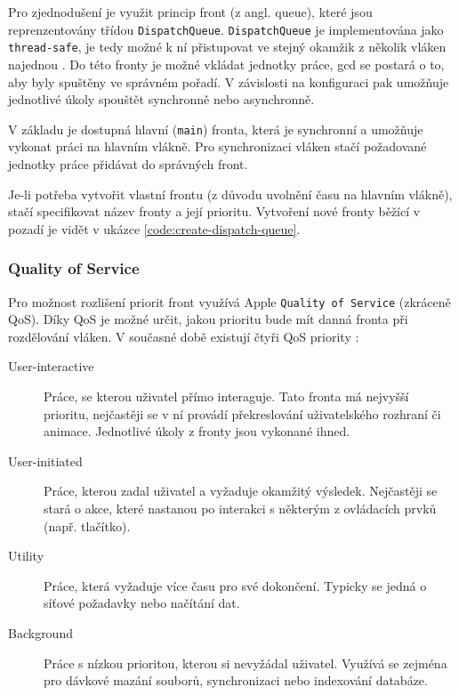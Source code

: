 Pro zjednodušení je využit princip front (z angl. queue), které jsou reprenzentovány třídou \texttt{DispatchQueue}.
\texttt{DispatchQueue} je implementována jako \texttt{thread-safe}, je tedy možné k ní přistupovat ve stejný okamžik z několik vláken najednou \cite{apple-concurrency-programming-guide}.
Do této fronty je možné vkládat jednotky práce, \acrshort{gcd} se postará o to, aby byly spuštěny ve správném pořadí.
V závislosti na konfiguraci pak umožňuje jednotlivé úkoly spouštět synchronně nebo asynchronně.

V základu je dostupná hlavní (\texttt{main}) fronta, která je synchronní a umožňuje vykonat práci na hlavním vlákně.
Pro synchronizaci vláken stačí požadované jednotky práce přidávat do správných front.

Je-li potřeba vytvořit vlastní frontu (z důvodu uvolnění času na hlavním vlákně), stačí specifikovat název fronty a její prioritu.
Vytvoření nové fronty běžící v pozadí je vidět v ukázce \ref{code:create-dispatch-queue}.


\subsubsection*{Quality of Service}

Pro možnost rozlišení priorit front využívá Apple \texttt{Quality of Service} (zkráceně QoS).
Díky QoS je možné určit, jakou prioritu bude mít danná fronta při rozdělování vláken.
V současné době existují čtyři QoS priority \cite{apple-prioritize-work-with-qos}:

\begin{description}
  \item[User-interactive] Práce, se kterou uživatel přímo interaguje.
  Tato fronta má nejvyšší prioritu, nejčastěji se v ní provádí překreslování uživatelského rozhraní či animace.
  Jednotlivé úkoly z fronty jsou vykonané ihned.
  \item[User-initiated] Práce, kterou zadal uživatel a vyžaduje okamžitý výsledek.
  Nejčastěji se stará o akce, které nastanou po interakci s některým z ovládacích prvků (např. tlačítko).
  \item[Utility] Práce, která vyžaduje více času pro své dokončení.
  Typicky se jedná o síťové požadavky nebo načítání dat.
  \item[Background] Práce s nízkou prioritou, kterou si nevyžádal uživatel.
  Využívá se zejména pro dávkové mazání souborů, synchronizaci nebo indexování databáze.
\end{description}

